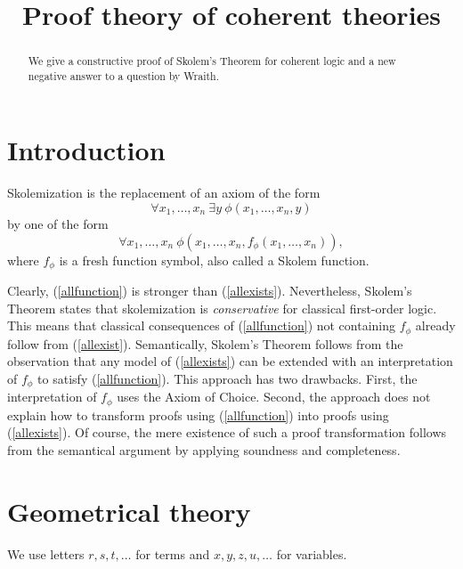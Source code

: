 \documentclass[10pt,a4paper]{article}
\newcommand{\many}[2]{{#1_1},\ldots,{#1_#2}}
\begin{document}
\title{Proof theory of coherent theories}

\author{}
\date{}
\maketitle

\begin{abstract}
We give a constructive proof of Skolem's Theorem for coherent logic
and a new negative answer to a question by Wraith.
\end{abstract}


\section*{Introduction}
Skolemization is the replacement of an axiom of the form
\begin{equation}\label{allexists}
\forall\many{x}{n}~\exists y~\phi(\many{x}{n},y)
\end{equation}
by one of the form
\begin{equation}\label{allfunction}
\forall\many{x}{n}~\phi(\many{x}{n},f_\phi(\many{x}{n})),
\end{equation}
where $f_\phi$ is a fresh function symbol, also called a Skolem function.

Clearly, (\ref{allfunction}) is stronger than (\ref{allexists}).
Nevertheless, Skolem's Theorem states that skolemization is \emph{conservative}
for classical first-order logic. This means that classical consequences of
(\ref{allfunction}) not containing $f_\phi$ already follow from (\ref{allexist}). 
Semantically, Skolem's Theorem follows from the observation that
any model of (\ref{allexists}) can be extended with an interpretation
of $f_\phi$ to satisfy (\ref{allfunction}). This approach has two
drawbacks. First, the interpretation of $f_\phi$ uses the Axiom of Choice.
Second, the approach does not explain how to transform proofs using
(\ref{allfunction}) into proofs using (\ref{allexists}).
Of course, the mere existence of such a proof transformation
follows from the semantical argument by applying soundness and completeness.



\section{Geometrical theory}
 
 We use letters $r,s,t,\dots$ for terms and $x,y,z,u,\dots$ for variables.
\end{document}

